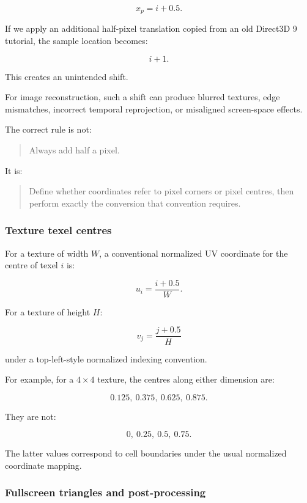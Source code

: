\[
 x_p=i+0.5.
\]

If we apply an additional half-pixel translation copied from an old Direct3D 9 tutorial, the sample location becomes:

\[
 i+1.
\]

This creates an unintended shift.

For image reconstruction, such a shift can produce blurred textures, edge mismatches, incorrect temporal reprojection, or misaligned screen-space effects.

The correct rule is not:

\begin{quote}
Always add half a pixel.
\end{quote}

It is:

\begin{quote}
Define whether coordinates refer to pixel corners or pixel centres, then perform exactly the conversion that convention requires.
\end{quote}

\subsubsection{Texture texel centres}\label{texture-texel-centres}

For a texture of width \(W\), a conventional normalized UV coordinate for the centre of texel \(i\) is:

\[
 \boxed{ u_i=\frac{i+0.5}{W} }.
\]

For a texture of height \(H\):

\[
 \boxed{ v_j=\frac{j+0.5}{H} }
\]

under a top-left-style normalized indexing convention.

For example, for a \(4\times4\) texture, the centres along either dimension are:

\[
 \boxed{ 0.125,\ 0.375,\ 0.625,\ 0.875 }.
\]

They are not:

\[
 0,\ 0.25,\ 0.5,\ 0.75.
\]

The latter values correspond to cell boundaries under the usual normalized coordinate mapping.

\subsubsection{Fullscreen triangles and post-processing}\label{fullscreen-triangles-and-post-processing}

